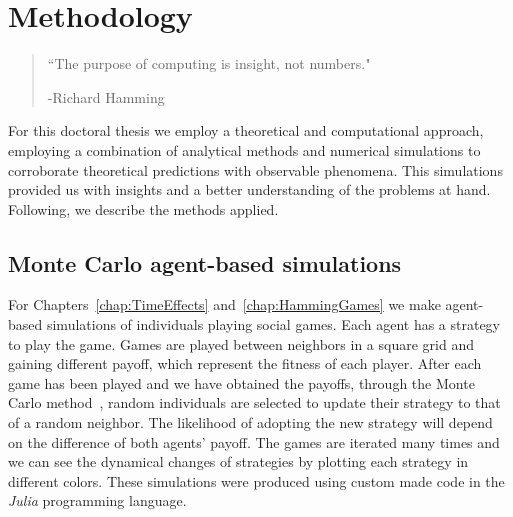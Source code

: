 \chapter{Methodology}
\label{chap:Method}


\begin{quotation}


	\vspace{-3cm}


    \begin{flushright}
    \begin{minipage}[t][5cm][b]{0.5\textwidth}
    { ``The purpose of computing is insight, not numbers."}
    
    \bigskip
    
    -{\small  Richard Hamming}
    \end{minipage}
    \end{flushright}
    
    \vspace{0.5cm}
\end{quotation}





For this doctoral thesis we employ a theoretical and computational approach, employing a combination of analytical methods and numerical simulations to corroborate theoretical predictions with observable phenomena. This simulations provided us with insights and a better understanding of the problems at hand. Following, we describe the methods applied.


\section{Monte Carlo agent-based simulations}

For Chapters~\ref{chap:TimeEffects} and~\ref{chap:HammingGames} we make agent-based simulations of individuals playing social games. Each agent has a strategy to play the game. Games are played between neighbors in a square grid and gaining different payoff, which represent the fitness of each player. After each game has been played and we have obtained the payoffs, through the Monte Carlo method~\cite{MonteCarlo}, random individuals are selected to update their strategy to that of a random neighbor. The likelihood of adopting the new strategy will depend on the difference of both agents' payoff. The games are iterated many times and we can see the dynamical changes of strategies by plotting each strategy in different colors. These simulations were produced using custom made code in the \textit{Julia} programming language.

